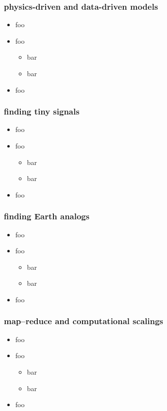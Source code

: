 \documentclass[pdftex]{beamer}
\begin{document}
\begin{frame}
  \frametitle{physics-driven and data-driven models}
  \begin{itemize}
  \item foo
  \item foo
    \begin{itemize}
    \item bar
    \item bar
    \end{itemize}
  \item foo
  \end{itemize}
\end{frame}

\begin{frame}
  \frametitle{finding tiny signals}
  \begin{itemize}
  \item foo
  \item foo
    \begin{itemize}
    \item bar
    \item bar
    \end{itemize}
  \item foo
  \end{itemize}
\end{frame}

\begin{frame}
  \frametitle{finding Earth analogs}
  \begin{itemize}
  \item foo
  \item foo
    \begin{itemize}
    \item bar
    \item bar
    \end{itemize}
  \item foo
  \end{itemize}
\end{frame}

\begin{frame}
  \frametitle{map--reduce and computational scalings}
  \begin{itemize}
  \item foo
  \item foo
    \begin{itemize}
    \item bar
    \item bar
    \end{itemize}
  \item foo
  \end{itemize}
\end{frame}
\end{document}
